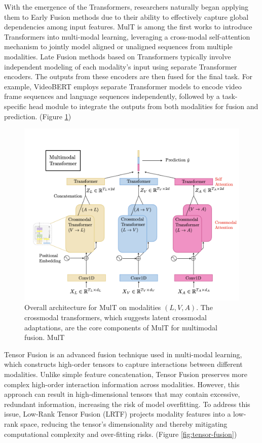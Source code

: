 \documentclass{article}
\begin{document}
With the emergence of the Transformers, researchers naturally began applying them to Early Fusion methods due to their ability to effectively capture global dependencies among input features. MulT \cite{tsai-etal-2019-multimodal} is among the first works to introduce Transformers into multi-modal learning, leveraging a cross-modal self-attention mechanism to jointly model aligned or unaligned sequences from multiple modalities. Late Fusion methods based on Transformers typically involve independent modeling of each modality's input using separate Transformer encoders. The outputs from these encoders are then fused for the final task. For example, VideoBERT \cite{Sun2019VideoBERT} employs separate Transformer models to encode video frame sequences and language sequences independently, followed by a task-specific head module to integrate the outputs from both modalities for fusion and prediction. (Figure \ref{fig:mult-1})

\begin{figure}[h]
    \centering
    \includegraphics[width=1\linewidth]{figs/Mult-1.png}
    \caption{Overall architecture for MulT on modalities $(L,V,A)$. The crossmodal transformers, which suggests latent crossmodal adaptations, are the core components of MulT for multimodal fusion. MulT \cite{tsai-etal-2019-multimodal}}
    \label{fig:mult-1}
\end{figure}

Tensor Fusion \cite{zadeh-etal-2017-tensor} is an advanced fusion technique used in multi-modal learning, which constructs high-order tensors to capture interactions between different modalities. Unlike simple feature concatenation, Tensor Fusion preserves more complex high-order interaction information across modalities. However, this approach can result in high-dimensional tensors that may contain excessive, redundant information, increasing the risk of model overfitting. To address this issue, Low-Rank Tensor Fusion (LRTF) \cite{Liu2018EfficientLM} projects modality features into a low-rank space, reducing the tensor's dimensionality and thereby mitigating computational complexity and over-fitting risks. (Figure \ref{fig:tensor-fusion})
\end{document}
